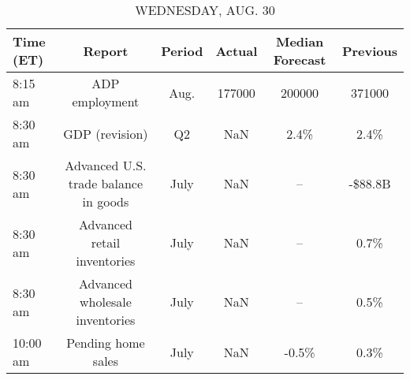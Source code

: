 \documentclass{article}%
\begin{document}
\begin{table}[htbp]%
\caption{WEDNESDAY, AUG. 30}%
\centering%
\begin{adjustbox}{width=1\textwidth}%
\begin{tabular}{lccccc}
\toprule
Time (ET) &                               Report & Period & Actual & Median Forecast & Previous \\
\midrule
  8:15 am &                       ADP employment &   Aug. & 177000 &          200000 &   371000 \\
  8:30 am &                       GDP (revision) &     Q2 &    NaN &            2.4\% &     2.4\% \\
  8:30 am & Advanced U.S. trade balance in goods &   July &    NaN &              -- &  -\$88.8B \\
  8:30 am &          Advanced retail inventories &   July &    NaN &              -- &     0.7\% \\
  8:30 am &       Advanced wholesale inventories &   July &    NaN &              -- &     0.5\% \\
 10:00 am &                   Pending home sales &   July &    NaN &           -0.5\% &     0.3\% \\
\bottomrule
\end{tabular}
%
\end{adjustbox}%
\end{table}

%
\end{document}
